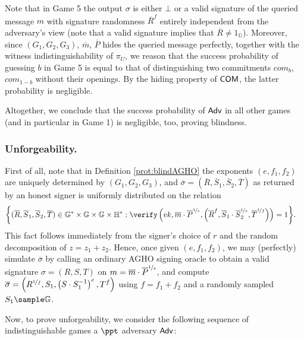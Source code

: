 Note that in Game 5 the output $\sigma$ is either $\bot$ or a valid signature of the queried message $m$ with signature randomness $\overline R^{f}$ entirely independent from the adversary's view (note that a valid signature implies that $\overline R\neq 1_\mathbb{G}$).
Moreover, since $(G_1,G_2,G_3)$, $\overline m$, $\overline P$ hides the queried message perfectly, together with the witness indistinguishability of $\pi_U$, we reason that the success probability of guessing $b$ in Game 5 is equal to that of distinguishing two commitments $com_b$, $com_{1-b}$ without their openings.
By the hiding property of $\operatorname{\mathsf{COM}}$, the latter probability is negligible.

Altogether, we conclude  that the success probability of $\mathsf{Adv}$ in  all other games (and in particular in Game 1) is negligible, too, proving blindness. 


\subsubsection{Unforgeability.}

First of all, note that in Definition \ref{prot:blindAGHO} the exponents $(e, f_1, f_2)$ are uniquely determined by $(G_1,G_2,G_3)$, and   $\overline\sigma=(\overline R, \overline S_1, \overline S_2, \overline T)$ as returned by an honest signer is uniformly distributed on the relation
\begin{align*}
\bigg\{(\overline R, \overline S_1, \overline S_2, \overline T)\in \mathbb G^*\times\mathbb G\times \mathbb G&\times\mathbb H^* : 
\verify\left(vk, \overline m\cdot \overline P^{\nicefrac{1}{e}}, \left(\overline R^f, \overline S_1\cdot \overline S_2^{\nicefrac{1}{e}}, \overline T^{\nicefrac{1}{f}} \right)\right) = 1\bigg\}. 
\end{align*}
This fact follows immediately from the signer's choice of $r$ and the random decomposition of $z=z_1+z_2$.
Hence, once given $(e, f_1, f_2)$, we may (perfectly) simulate $\overline\sigma$ by calling an ordinary AGHO signing oracle to obtain a valid signature $\sigma = (R,S,T)$ on $m =\overline m\cdot \overline P^{\nicefrac{1}{e}}$, and compute 
$
\overline\sigma= \left(R^{\nicefrac{1}{f}}, S_1, \left(S\cdot S_1^{-1}\right)^e, T^f\right)
$ 
using $f= f_1+f_2$ and a randomly sampled $S_1\sample\mathbb G$.

Now, to prove unforgeability, we consider the following sequence of indistinguishable games a $\ppt$ adversary $\mathsf{Adv}$:

